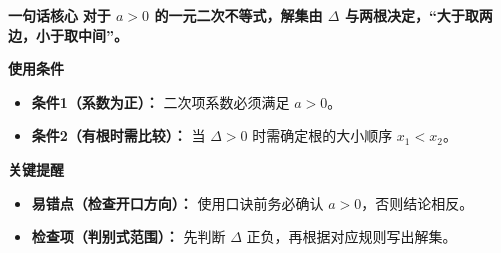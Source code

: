 \begin{summarybox}
	\textbf{\textcolor{CSummary}{一句话核心}}
	\textbf{对于 $a>0$ 的一元二次不等式，解集由 $\Delta$ 与两根决定，“大于取两边，小于取中间”。}

	\medskip
	\textbf{\textcolor{CSummary}{使用条件}}
	\begin{itemize}[leftmargin=*, itemsep=0.5em, topsep=0.4em]
		\item \textbf{条件1（系数为正）：} 二次项系数必须满足 $a>0$。
		\item \textbf{条件2（有根时需比较）：} 当 $\Delta>0$ 时需确定根的大小顺序 $x_1<x_2$。
	\end{itemize}

	\medskip
	\textbf{\textcolor{CSummary}{关键提醒}}
	\begin{itemize}[leftmargin=*, itemsep=0.5em, topsep=0.4em]
		\item \textbf{易错点（检查开口方向）：} 使用口诀前务必确认 $a>0$，否则结论相反。
		\item \textbf{检查项（判别式范围）：} 先判断 $\Delta$ 正负，再根据对应规则写出解集。
	\end{itemize}

\end{summarybox}
